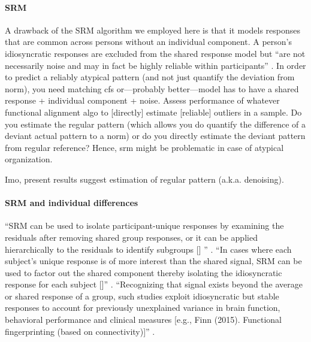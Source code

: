 


\paragraph{SRM}


%
A drawback of the SRM algorithm we employed here is that it models responses
that are common across persons without an individual component.
%
A person's idiosyncratic responses are excluded from the shared response model
but ``are not necessarily noise and may in fact be highly reliable within
participants'' \citep{cohen2017computational}.
%
In order to predict a reliably atypical pattern (and not just quantify the
deviation from norm), you need matching \ac{cfs} or---probably better---model
has to have a shared response + individual component + noise.
%
Assess performance of whatever functional alignment algo to [directly] estimate
[reliable] outliers in a sample.
%
Do you estimate the regular pattern (which allows you do quantify the difference
of a deviant actual pattern to a norm) or do you directly estimate the deviant
pattern from regular reference?
%
Hence, \ac{srm} might be problematic in case of atypical organization.

%
Imo, present results suggest estimation of regular pattern (a.k.a. denoising).


\paragraph{SRM and individual differences}
%
``SRM can be used to isolate participant-unique responses by examining the
residuals after removing shared group responses, or it can be applied
hierarchically to the residuals to identify subgroups [\citet{chen2017shared}]
'' \citep{cohen2017computational}.
%
``In cases where each subject's unique response is of more interest than the
shared signal, SRM can be used to factor out the shared component thereby
isolating the idiosyncratic response for each subject
[\citep{chen2015reduced}]'' \citep{kumar2020brainiak}.
%
``Recognizing that signal exists beyond the average or shared response of a
group, such studies exploit idiosyncratic but stable responses to account for
previously unexplained variance in brain function, behavioral performance and
clinical measures [e.g., Finn (2015). Functional fingerprinting (based on
connectivity)]'' \citep{cohen2017computational}.



